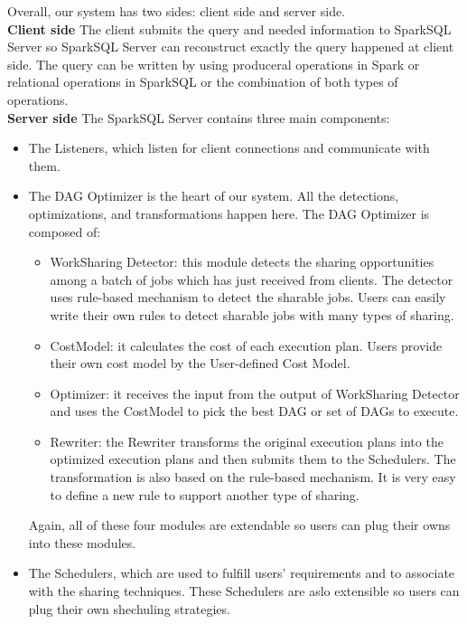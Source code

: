 Overall, our system has two sides: client side and server side.\\
\textbf{Client side} The client submits the query and needed information to SparkSQL Server so SparkSQL Server can reconstruct exactly the query happened at client side. The query can be written by using produceral operations in Spark or relational operations in SparkSQL or the combination of both types of operations.\\
\textbf{Server side}  The SparkSQL Server contains three main components:\\
\begin{itemize}
\item The Listeners, which listen for client connections and communicate with them.
\item The DAG Optimizer is the heart of our system. All the detections, optimizations, and transformations happen here. The DAG Optimizer is composed of:
\begin{itemize}
\item WorkSharing Detector: this module detects the sharing opportunities among a batch of jobs which has just received from clients. The detector uses rule-based mechanism to detect the sharable jobs. Users can easily write their own rules to detect sharable jobs with many types of sharing.
\item CostModel: it calculates the cost of each execution plan. Users provide their own cost model by the User-defined Cost Model.
\item Optimizer: it receives the input from the output of WorkSharing Detector and uses the CostModel to pick the best DAG or set of DAGs to execute.
\item Rewriter: the Rewriter transforms the original execution plans into the optimized execution plans and then submits them to the Schedulers. The transformation is also based on the rule-based mechanism. It is very easy to define a new rule to support another type of sharing.
\end{itemize} 
Again, all of these four modules are extendable so users can plug their owns into these modules.
\item The Schedulers, which are used to fulfill users' requirements and to associate with the sharing techniques. These Schedulers are aslo extensible so users can plug their own shechuling strategies.
\end{itemize}


